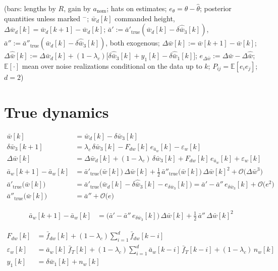 \documentclass[11pt,a4paper,fontset=none]{ctexart}
\newcommand{\ba}{\bar{a}}
\newcommand{\bw}{\bar{w}}
\newcommand{\E}{\mathbb{E}}
\newcommand{\dW}{\Delta\bw}
\newcommand{\dWh}{\Delta\hat{\bw}}
\newcommand{\eD}{e_{\Delta\bw}}
\newcommand{\ap}{\ba'}
\newcommand{\app}{\ba''}
\begin{document}
(bars: lengths by $R$, gain by $a_{\mathrm{nom}}$; hats on estimates;
$e_{\theta} = \theta - \hat{\theta}$; posterior quantities unless marked $^{-}$;
$\bw_d[k]$ commanded height, $\Delta\bw_d[k] = \bw_d[k+1] - \bw_d[k]$;
$\ap := \ap_{\mathrm{true}}(\bw_d[k] - \delta\hat{\bw}_3[k])$, $\app := \app_{\mathrm{true}}(\bw_d[k] - \delta\hat{\bw}_3[k])$, both exogenous;
$\dW[k] := \bw[k+1] - \bw[k]$; $\dWh[k] := \Delta\bw_d[k] + (1-\lambda_c)\bigl[\delta\hat{\bw}_3[k] + y_1[k] - \delta\hat{\bw}_1[k]\bigr]$;
$\eD := \dW - \dWh$;
$\E[\cdot]$ mean over noise realizations conditional on the data up to $k$; $P_{ij} = \E[e_i e_j]$; $d = 2$)

\section{True dynamics}

\begin{align*}
\bw[k]            &= \bw_d[k] - \delta\bw_3[k] \\
\delta\bw_3[k+1]  &= \lambda_c\,\delta\bw_3[k] - F_{dw}[k]\,e_{\ba_w}[k] - \varepsilon_w[k] \\
\dW[k]            &= \Delta\bw_d[k] + (1-\lambda_c)\,\delta\bw_3[k] + F_{dw}[k]\,e_{\ba_w}[k] + \varepsilon_w[k] \\
\ba_w[k+1] - \ba_w[k] &= \ap_{\mathrm{true}}\bigl(\bw[k]\bigr)\,\dW[k]
                       + \tfrac{1}{2}\,\app_{\mathrm{true}}\bigl(\bw[k]\bigr)\,\dW[k]^{2} + \mathcal{O}\bigl(\dW^{3}\bigr) \\
\ap_{\mathrm{true}}\bigl(\bw[k]\bigr)  &= \ap_{\mathrm{true}}\bigl(\bw_d[k] - \delta\hat{\bw}_3[k] - e_{\delta\bw_3}[k]\bigr)
                                        = \ap - \app\,e_{\delta\bw_3}[k] + \mathcal{O}\bigl(e^{2}\bigr) \\
\app_{\mathrm{true}}\bigl(\bw[k]\bigr) &= \app + \mathcal{O}\bigl(e\bigr)
\end{align*}

\begin{align*}
\ba_w[k+1] - \ba_w[k] &= \bigl(\ap - \app\,e_{\delta\bw_3}[k]\bigr)\,\dW[k] + \tfrac{1}{2}\,\app\,\dW[k]^{2}
\end{align*}

\begin{align*}
F_{dw}[k]        &= \bar{f}_{dw}[k] + (1-\lambda_c)\sum_{i=1}^{d}\bar{f}_{dw}[k-i] \\
\varepsilon_w[k] &= \ba_w[k]\,\bar{f}_T[k] + (1-\lambda_c)\sum_{i=1}^{d}\ba_w[k-i]\,\bar{f}_T[k-i] + (1-\lambda_c)\,n_w[k] \\
y_1[k]           &= \delta\bw_1[k] + n_w[k]
\end{align*}
\end{document}
